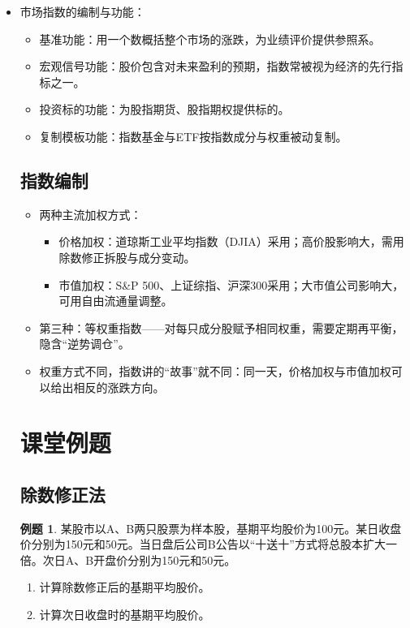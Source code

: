 \documentclass[11pt]{ctexart}
\theoremstyle{definition}
\newtheorem{example}{例题}[section]
\begin{document}
\begin{itemize}
    \item 市场指数的编制与功能：
    \begin{itemize}
        \item 基准功能：用一个数概括整个市场的涨跌，为业绩评价提供参照系。
        \item 宏观信号功能：股价包含对未来盈利的预期，指数常被视为经济的先行指标之一。
        \item 投资标的功能：为股指期货、股指期权提供标的。
        \item 复制模板功能：指数基金与ETF按指数成分与权重被动复制。
    \end{itemize}

    \subsection*{指数编制}

    \begin{itemize}
        \item 两种主流加权方式：
        \begin{itemize}
            \item 价格加权：道琼斯工业平均指数（DJIA）采用；高价股影响大，需用除数修正拆股与成分变动。
            \item 市值加权：S&P 500、上证综指、沪深300采用；大市值公司影响大，可用自由流通量调整。
        \end{itemize}

        \item 第三种：等权重指数——对每只成分股赋予相同权重，需要定期再平衡，隐含“逆势调仓”。

        \item 权重方式不同，指数讲的“故事”就不同：同一天，价格加权与市值加权可以给出相反的涨跌方向。
    \end{itemize}

\section*{课堂例题}

\subsection*{除数修正法}

\begin{example}
    某股市以A、B两只股票为样本股，基期平均股价为100元。某日收盘价分别为150元和50元。当日盘后公司B公告以“十送十”方式将总股本扩大一倍。次日A、B开盘价分别为150元和50元。
    \begin{enumerate}
        \item 计算除数修正后的基期平均股价。
        \item 计算次日收盘时的基期平均股价。
    \end{enumerate}
\end{example}


\end{itemize}
\end{document}
